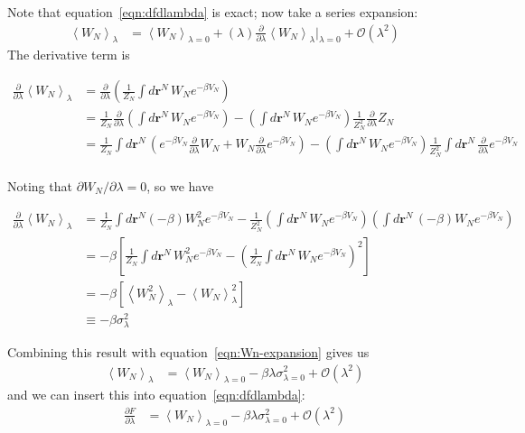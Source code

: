 \documentclass[letterpaper,twocolumn,amsmath,amssymb,prb]{revtex4-1}
\newcommand{\rr}{\ensuremath{\mathbf{r}}}
\newcommand{\1}{\ensuremath{\textbf{r}_1}}
\newcommand{\2}{\ensuremath{\textbf{r}_2}}
\newcommand{\3}{\ensuremath{\textbf{r}_3}}
\newcommand{\4}{\ensuremath{\textbf{r}_4}}
\begin{document}
Note that equation~\ref{eqn:dfdlambda} is exact; now take a series expansion:
\begin{align}
  \left\langle W_N \right\rangle_\lambda &= \left\langle W_N\right\rangle_{\lambda = 0} + (\lambda)\frac{\partial}{\partial\lambda}\left\langle W_N \right\rangle_{\lambda}\bigg|_{\lambda = 0} + \mathcal{O}(\lambda^2) \label{eqn:Wn-expansion}
\end{align}
The derivative term is
\begin{widetext}
  \begin{align}
    \frac{\partial}{\partial\lambda}\left\langle W_N \right\rangle_{\lambda} &= \frac{\partial}{\partial\lambda}\left( \frac{1}{Z_N}\int d\rr^N\, W_N e^{-\beta V_N}\right) \\
    &= \frac{1}{Z_N}\frac{\partial}{\partial\lambda}\left( \int d\rr^N\, W_N e^{-\beta V_N} \right) - \left( \int d\rr^N\, W_N e^{-\beta V_N} \right)\frac{1}{Z_N^2}\frac{\partial}{\partial\lambda}Z_N \\
    &= \frac{1}{Z_N}\int d\rr^N\, \left( e^{-\beta V_N}\frac{\partial}{\partial\lambda}W_N + W_N\frac{\partial}{\partial\lambda}e^{-\beta V_N} \right) - \left( \int d\rr^N\, W_N e^{-\beta V_N} \right)\frac{1}{Z_N^2}\int d\rr^N\, \frac{\partial}{\partial\lambda}e^{-\beta V_N} \\
  \end{align}
\end{widetext}

Noting that $\partial W_N/\partial\lambda = 0$, so we have
\begin{widetext}
  \begin{align}
    \frac{\partial}{\partial\lambda}\left\langle W_N \right\rangle_{\lambda} &= \frac{1}{Z_N}\int d\rr^N (-\beta) W_N^2 e^{-\beta V_N} - \frac{1}{Z_N^2}\left(\int d\rr^N\, W_N e^{-\beta V_N} \right)\left( \int d\rr^N\, (-\beta)W_Ne^{-\beta V_N} \right) \\
    &= -\beta\left[ \frac{1}{Z_N}\int d\rr^N\, W_N^2e^{-\beta V_N} - \left( \frac{1}{Z_N}\int d\rr^N\, W_N e^{-\beta V_N} \right)^2 \right] \\
    &= -\beta\left[ \left\langle W_N^2 \right\rangle_\lambda - \left\langle W_N \right\rangle_\lambda^2 \right] \\
    &\equiv -\beta\sigma_\lambda^2
  \end{align}
\end{widetext}

Combining this result with equation~\ref{eqn:Wn-expansion} gives us
\begin{align}
  \left\langle W_N \right\rangle_\lambda &= \left\langle W_N\right\rangle_{\lambda = 0} - \beta\lambda\sigma_{\lambda=0}^2 + \mathcal{O}(\lambda^2) \label{eqn:Wn-expansion-simplified}
\end{align}
and we can insert this into equation~\ref{eqn:dfdlambda}:
\begin{align}
  \frac{\partial F}{\partial\lambda} &= \left\langle W_N\right\rangle_{\lambda = 0} - \beta\lambda\sigma_{\lambda=0}^2 + \mathcal{O}(\lambda^2)
\end{align}
\end{document}
